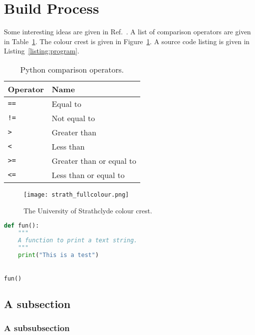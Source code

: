 \section{Build Process}
Some interesting ideas are given in Ref.~\cite{turing1950computing}.  A list of comparison operators are given in Table~\ref{table:comparison-operators}.  The colour crest is given in Figure~\ref{figure:colour-crest}.  A source code listing is given in Listing~\ref{listing:program}.

\begin{table}[h!!]
  \begin{center}
    \caption{Python comparison operators.}
    \label{table:comparison-operators}
    \begin{tabular}{l|l} \hline
      \textbf{Operator} & \textbf{Name}\\
      \hline
      \texttt{==} & Equal to\\
      \texttt{!=} & Not equal to\\
      \texttt{>} & Greater than\\
      \texttt{<} & Less than\\
      \texttt{>=} & Greater than or equal to\\
      \texttt{<=} & Less than or equal to\\ \hline
    \end{tabular}
  \end{center}
\end{table}

\begin{figure}[h!!]
  \begin{center}
    \texttt{[image: strath\_fullcolour.png]}
    \caption{The University of Strathclyde colour crest.}
    \label{figure:colour-crest}
  \end{center}
\end{figure}

\begin{singlespacing}
\begin{lstlisting}[language=python,caption={Demonstrating source code listing.},label=listing:program]
def fun():
    """
    A function to print a text string.
    """
    print("This is a test")


fun()
\end{lstlisting}
\end{singlespacing}

\lipsum[1-2]
\subsection{A subsection}
\lipsum[1-2]
\subsubsection{A subsubsection}
\lipsum[1-2]